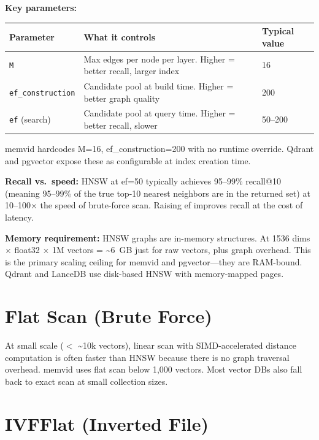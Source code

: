 \textbf{Key parameters:}

\begin{center}
\begin{tabular}{lll}
\toprule
\textbf{Parameter} & \textbf{What it controls} & \textbf{Typical value} \\
\midrule
\texttt{M} & Max edges per node per layer. Higher = better recall, larger index & 16 \\
\texttt{ef\_construction} & Candidate pool at build time. Higher = better graph quality & 200 \\
\texttt{ef} (search) & Candidate pool at query time. Higher = better recall, slower & 50--200 \\
\bottomrule
\end{tabular}
\end{center}

memvid hardcodes M=16, ef\_construction=200 with no runtime override. Qdrant and pgvector
expose these as configurable at index creation time.

\textbf{Recall vs.\ speed:} HNSW at ef=50 typically achieves 95--99\% recall@10 (meaning
95--99\% of the true top-10 nearest neighbors are in the returned set) at 10--100$\times$ the
speed of brute-force scan. Raising ef improves recall at the cost of latency.

\textbf{Memory requirement:} HNSW graphs are in-memory structures. At 1536 dims $\times$
float32 $\times$ 1M vectors = \textasciitilde6~GB just for raw vectors, plus graph overhead.
This is the primary scaling ceiling for memvid and pgvector---they are RAM-bound. Qdrant and
LanceDB use disk-based HNSW with memory-mapped pages.

\section{Flat Scan (Brute Force)}

At small scale ($<$ \textasciitilde10k vectors), linear scan with SIMD-accelerated distance
computation is often faster than HNSW because there is no graph traversal overhead. memvid
uses flat scan below 1{,}000 vectors. Most vector DBs also fall back to exact scan at small
collection sizes.

\section{IVFFlat (Inverted File)}

